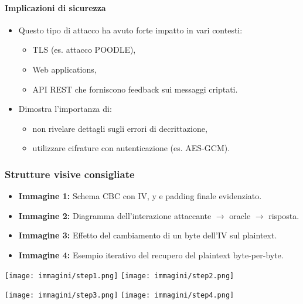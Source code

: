 \documentclass{report}
\begin{document}
\paragraph{Implicazioni di sicurezza}
\begin{itemize}
    \item Questo tipo di attacco ha avuto forte impatto in vari contesti:
    \begin{itemize}
        \item TLS (es. attacco POODLE),
        \item Web applications,
        \item API REST che forniscono feedback sui messaggi criptati.
    \end{itemize}
    \item Dimostra l’importanza di:
    \begin{itemize}
        \item non rivelare dettagli sugli errori di decrittazione,
        \item utilizzare cifrature con autenticazione (es. AES-GCM).
    \end{itemize}
\end{itemize}

\subsubsection{Strutture visive consigliate}

\begin{itemize}
    \item \textbf{Immagine 1:} Schema CBC con IV, y e padding finale evidenziato.
    \item \textbf{Immagine 2:} Diagramma dell’interazione attaccante $\rightarrow$ oracle $\rightarrow$ risposta.
    \item \textbf{Immagine 3:} Effetto del cambiamento di un byte dell’IV sul plaintext.
    \item \textbf{Immagine 4:} Esempio iterativo del recupero del plaintext byte-per-byte.
\end{itemize}

\begin{center}
    \texttt{[image: immagini/step1.png]}
    \hfill
    \texttt{[image: immagini/step2.png]}
    
    \vspace{0.5cm}
    
    \texttt{[image: immagini/step3.png]}
    \hfill
    \texttt{[image: immagini/step4.png]}
\end{center}
\end{document}
